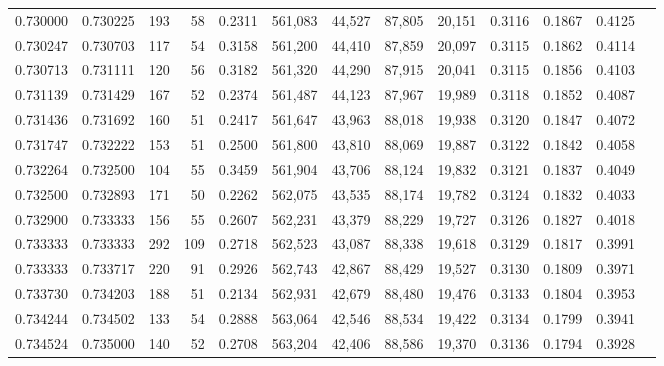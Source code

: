 \begin{tabular}{rrrrrrrrrrrrr}
0.730000 & 0.730225 &    193 &    58 &                                     0.2311 & 561,083 &  44,527 &  87,805 &  20,151 & 0.3116 & 0.1867 & 0.4125 \\
0.730247 & 0.730703 &    117 &    54 &                                     0.3158 & 561,200 &  44,410 &  87,859 &  20,097 & 0.3115 & 0.1862 & 0.4114 \\
0.730713 & 0.731111 &    120 &    56 &                                     0.3182 & 561,320 &  44,290 &  87,915 &  20,041 & 0.3115 & 0.1856 & 0.4103 \\
0.731139 & 0.731429 &    167 &    52 &                                     0.2374 & 561,487 &  44,123 &  87,967 &  19,989 & 0.3118 & 0.1852 & 0.4087 \\
0.731436 & 0.731692 &    160 &    51 &                                     0.2417 & 561,647 &  43,963 &  88,018 &  19,938 & 0.3120 & 0.1847 & 0.4072 \\
0.731747 & 0.732222 &    153 &    51 &                                     0.2500 & 561,800 &  43,810 &  88,069 &  19,887 & 0.3122 & 0.1842 & 0.4058 \\
0.732264 & 0.732500 &    104 &    55 &                                     0.3459 & 561,904 &  43,706 &  88,124 &  19,832 & 0.3121 & 0.1837 & 0.4049 \\
0.732500 & 0.732893 &    171 &    50 &                                     0.2262 & 562,075 &  43,535 &  88,174 &  19,782 & 0.3124 & 0.1832 & 0.4033 \\
0.732900 & 0.733333 &    156 &    55 &                                     0.2607 & 562,231 &  43,379 &  88,229 &  19,727 & 0.3126 & 0.1827 & 0.4018 \\
0.733333 & 0.733333 &    292 &   109 &                                     0.2718 & 562,523 &  43,087 &  88,338 &  19,618 & 0.3129 & 0.1817 & 0.3991 \\
0.733333 & 0.733717 &    220 &    91 &                                     0.2926 & 562,743 &  42,867 &  88,429 &  19,527 & 0.3130 & 0.1809 & 0.3971 \\
0.733730 & 0.734203 &    188 &    51 &                                     0.2134 & 562,931 &  42,679 &  88,480 &  19,476 & 0.3133 & 0.1804 & 0.3953 \\
0.734244 & 0.734502 &    133 &    54 &                                     0.2888 & 563,064 &  42,546 &  88,534 &  19,422 & 0.3134 & 0.1799 & 0.3941 \\
0.734524 & 0.735000 &    140 &    52 &                                     0.2708 & 563,204 &  42,406 &  88,586 &  19,370 & 0.3136 & 0.1794 & 0.3928 \\

\end{tabular}
